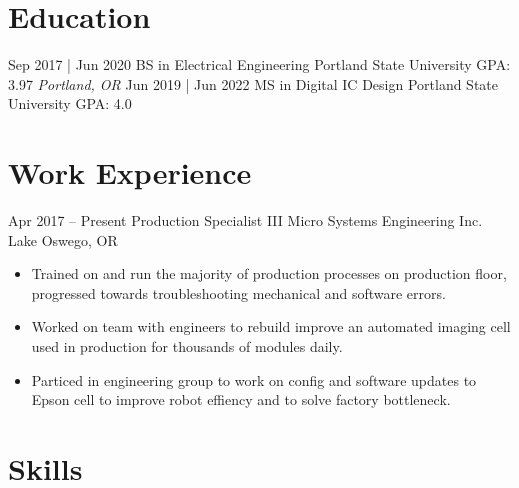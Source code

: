 \documentclass[letterpaper]{moderncv}        %
\begin{document}
\makecvtitle
    

\section{Education}
\cventry
{Sep 2017 | Jun 2020}
{BS in Electrical Engineering}
{Portland State University}
{GPA: 3.97}
{\textit{Portland, OR}}
{}
\cventry
{Jun 2019 | Jun 2022}
{MS in Digital IC Design}
{Portland State University}
{GPA: 4.0}
{\textit{}}
{}
\section{Work Experience}
\cventry
{Apr 2017 -- Present}
{Production Specialist III}
{Micro Systems Engineering Inc.}
{Lake Oswego, OR}
{}
{\begin{itemize}%
	\item Trained on and run the majority of production processes on production floor, progressed towards troubleshooting mechanical and software errors.
	\item Worked on team with engineers to rebuild improve an automated imaging cell used in production for thousands of modules daily.
	\item Particed in engineering group to work on config and software updates to Epson cell to improve robot effiency and to solve factory bottleneck.
	\end{itemize}}
\section{Skills}
\end{document}
